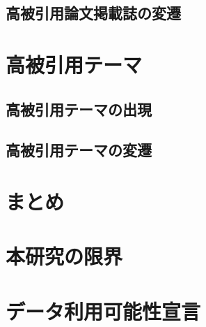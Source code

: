 \documentclass[12pt,a4paper,twocolumn,twoside]{ujsikpb}
\begin{document}
\subsection{高被引用論文掲載誌の変遷}







\section{高被引用テーマ}


\subsection{高被引用テーマの出現}


\subsection{高被引用テーマの変遷}








\section{まとめ}


\section{本研究の限界}


\section{データ利用可能性宣言}


\balance


\end{document}
